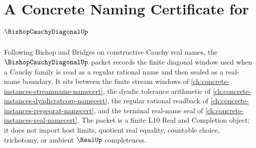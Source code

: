 \chapter{A Concrete Naming Certificate for $\BishopCauchyDiagonalUp$}
\label{ch:concrete-instances-bishop-cauchy-diagonal-namecert}

Following Bishop and Bridges on constructive Cauchy real names, the $\BishopCauchyDiagonalUp$ packet records the finite diagonal window used when a Cauchy family is read as a regular rational name and then sealed as a real-name boundary. It sits between the finite stream windows of \autoref{ch:concrete-instances-streamname-namecert}, the dyadic tolerance arithmetic of \autoref{ch:concrete-instances-dyadicratcore-namecert}, the regular rational readback of \autoref{ch:concrete-instances-regseqrat-namecert}, and the terminal real-name seal of \autoref{ch:concrete-instances-real-namecert}. The packet is a finite L10 Real and Completion object; it does not import host limits, quotient real equality, countable choice, trichotomy, or ambient $\RealUp$ completeness.

